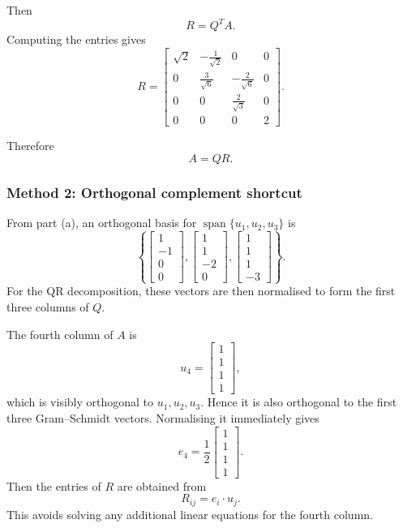 \documentclass[12pt]{article}
\newcommand{\Span}{\operatorname{span}}
\begin{document}
Then
\[
R=Q^TA.
\]
Computing the entries gives
\[
R=
\begin{bmatrix}
\sqrt2&-\frac1{\sqrt2}&0&0\\[0.3em]
0&\frac3{\sqrt6}&-\frac2{\sqrt6}&0\\[0.3em]
0&0&\frac2{\sqrt3}&0\\[0.3em]
0&0&0&2
\end{bmatrix}.
\]

Therefore
\[
\boxed{A=QR.}
\]

\subsubsection{Method 2: Orthogonal complement shortcut}

From part (a), an orthogonal basis for $\Span\{u_1,u_2,u_3\}$ is
\[
\left\{
\begin{bmatrix}1\\-1\\0\\0\end{bmatrix},
\begin{bmatrix}1\\1\\-2\\0\end{bmatrix},
\begin{bmatrix}1\\1\\1\\-3\end{bmatrix}
\right\}.
\]
For the QR decomposition, these vectors are then normalised to form the first three columns of $Q$.

The fourth column of $A$ is
\[
u_4=
\begin{bmatrix}1\\1\\1\\1\end{bmatrix},
\]
which is visibly orthogonal to $u_1,u_2,u_3$. Hence it is also orthogonal to the first three Gram--Schmidt vectors. Normalising it immediately gives
\[
e_4=\frac12
\begin{bmatrix}1\\1\\1\\1\end{bmatrix}.
\]
Then the entries of $R$ are obtained from
\[
R_{ij}=e_i\cdot u_j.
\]
This avoids solving any additional linear equations for the fourth column.
\end{document}
